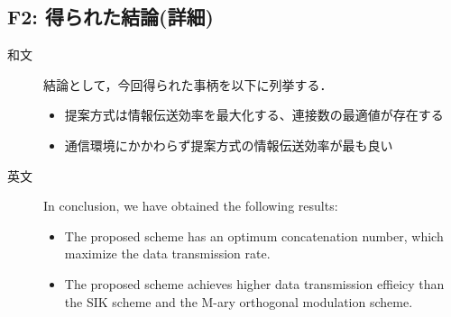﻿\documentclass[a4j,10pt]{jarticle}
\begin{document}
\subsection{F2: 得られた結論(詳細)} %
\begin{description}
 \item[和文] 結論として，今回得られた事柄を以下に列挙する．
\begin{itemize}
 \item 提案方式は情報伝送効率を最大化する、連接数の最適値が存在する
 \item 通信環境にかかわらず提案方式の情報伝送効率が最も良い
\end{itemize}
%
 \item[英文] In conclusion, we have obtained the following results:
 \begin{itemize}
 \item The proposed scheme has an optimum concatenation number, which maximize the data transmission rate. 
 \item The proposed scheme achieves higher data transmission effieicy than the SIK scheme and the M-ary orthogonal modulation scheme. 
 \end{itemize}
\end{description}
%
\end{document}
